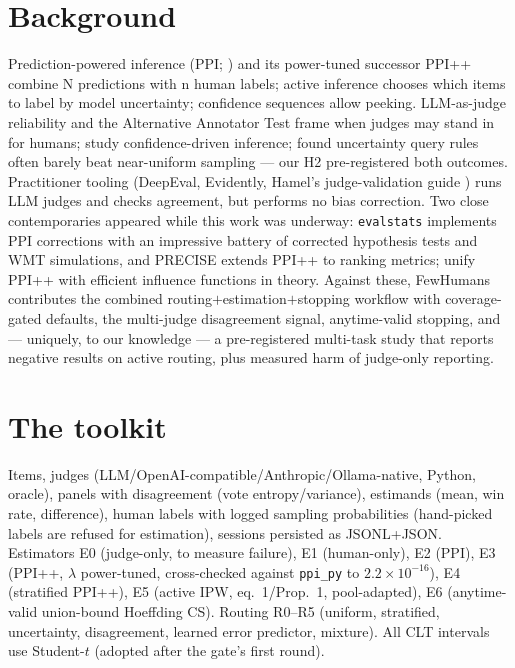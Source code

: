 \documentclass[11pt]{article}
\begin{document}
\section{Background}
Prediction-powered inference (PPI; \citealt{angelopoulos2023ppi}) and its
power-tuned successor PPI++ \citep{angelopoulos2023ppip} combine N predictions
with n human labels; active inference \citep{zrnic2024active} chooses which
items to label by model uncertainty; confidence sequences
\citep{howard2021time} allow peeking. LLM-as-judge reliability and the
Alternative Annotator Test \citep{calderon2025alt} frame when judges may stand
in for humans; \citet{gligoric2024unconfident} study confidence-driven
inference; \citet{sfyraki2026revisiting} found uncertainty query rules often
barely beat near-uniform sampling --- our H2 pre-registered both outcomes.
Practitioner tooling (DeepEval, Evidently, Hamel's judge-validation guide
\citealp{husain2024judge}) runs LLM judges and checks agreement, but performs
no bias correction. Two close contemporaries appeared while this work was
underway: \texttt{evalstats} \citep{arawjo2026evalstats} implements PPI
corrections with an impressive battery of corrected hypothesis tests and WMT
simulations, and PRECISE \citep{precise2026aaai} extends PPI++ to ranking
metrics; \citet{chen2026efficient} unify PPI++ with efficient influence
functions in theory. Against these, FewHumans contributes the combined
routing$+$estimation$+$stopping workflow with coverage-gated defaults, the
multi-judge disagreement signal, anytime-valid stopping, and --- uniquely, to
our knowledge --- a pre-registered multi-task study that reports negative
results on active routing, plus measured harm of judge-only reporting.

\section{The toolkit}
Items, judges (LLM/OpenAI-compatible/Anthropic/Ollama-native, Python,
oracle), panels with disagreement (vote entropy/variance), estimands (mean,
win rate, difference), human labels with logged sampling probabilities
(hand-picked labels are refused for estimation), sessions persisted as
JSONL+JSON. Estimators E0 (judge-only, to measure failure), E1 (human-only),
E2 (PPI), E3 (PPI++, $\lambda$ power-tuned, cross-checked against
\texttt{ppi\_py} to $2.2\times10^{-16}$), E4 (stratified PPI++),
E5 (active IPW, \citealt{zrnic2024active} eq.~1/Prop.~1, pool-adapted),
E6 (anytime-valid union-bound Hoeffding CS). Routing R0--R5 (uniform,
stratified, uncertainty, disagreement, learned error predictor, mixture).
All CLT intervals use Student-$t$ (adopted after the gate's first round).
\end{document}
